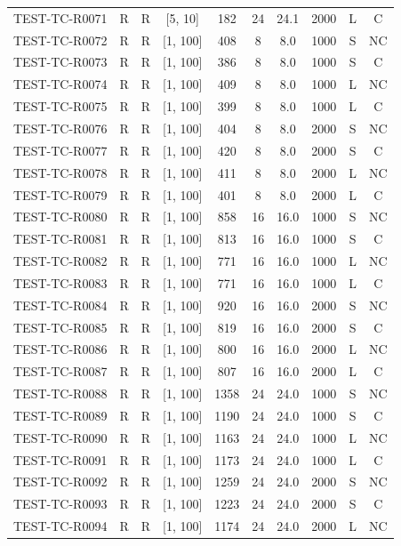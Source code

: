 \begin{longtable}{lccccccccc}
TEST-TC-R0071 & R & R & [5, 10] & 182 & 24 & 24.1 & 2000 & L & C \\
TEST-TC-R0072 & R & R & [1, 100] & 408 & 8 & 8.0 & 1000 & S & NC \\
TEST-TC-R0073 & R & R & [1, 100] & 386 & 8 & 8.0 & 1000 & S & C \\
TEST-TC-R0074 & R & R & [1, 100] & 409 & 8 & 8.0 & 1000 & L & NC \\
TEST-TC-R0075 & R & R & [1, 100] & 399 & 8 & 8.0 & 1000 & L & C \\
TEST-TC-R0076 & R & R & [1, 100] & 404 & 8 & 8.0 & 2000 & S & NC \\
TEST-TC-R0077 & R & R & [1, 100] & 420 & 8 & 8.0 & 2000 & S & C \\
TEST-TC-R0078 & R & R & [1, 100] & 411 & 8 & 8.0 & 2000 & L & NC \\
TEST-TC-R0079 & R & R & [1, 100] & 401 & 8 & 8.0 & 2000 & L & C \\
TEST-TC-R0080 & R & R & [1, 100] & 858 & 16 & 16.0 & 1000 & S & NC \\
TEST-TC-R0081 & R & R & [1, 100] & 813 & 16 & 16.0 & 1000 & S & C \\
TEST-TC-R0082 & R & R & [1, 100] & 771 & 16 & 16.0 & 1000 & L & NC \\
TEST-TC-R0083 & R & R & [1, 100] & 771 & 16 & 16.0 & 1000 & L & C \\
TEST-TC-R0084 & R & R & [1, 100] & 920 & 16 & 16.0 & 2000 & S & NC \\
TEST-TC-R0085 & R & R & [1, 100] & 819 & 16 & 16.0 & 2000 & S & C \\
TEST-TC-R0086 & R & R & [1, 100] & 800 & 16 & 16.0 & 2000 & L & NC \\
TEST-TC-R0087 & R & R & [1, 100] & 807 & 16 & 16.0 & 2000 & L & C \\
TEST-TC-R0088 & R & R & [1, 100] & 1358 & 24 & 24.0 & 1000 & S & NC \\
TEST-TC-R0089 & R & R & [1, 100] & 1190 & 24 & 24.0 & 1000 & S & C \\
TEST-TC-R0090 & R & R & [1, 100] & 1163 & 24 & 24.0 & 1000 & L & NC \\
TEST-TC-R0091 & R & R & [1, 100] & 1173 & 24 & 24.0 & 1000 & L & C \\
TEST-TC-R0092 & R & R & [1, 100] & 1259 & 24 & 24.0 & 2000 & S & NC \\
TEST-TC-R0093 & R & R & [1, 100] & 1223 & 24 & 24.0 & 2000 & S & C \\
TEST-TC-R0094 & R & R & [1, 100] & 1174 & 24 & 24.0 & 2000 & L & NC \\

\end{longtable}
